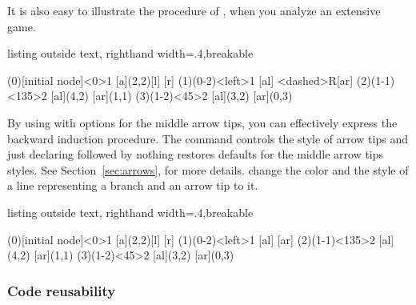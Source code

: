 It is also easy to illustrate the procedure of , when you analyze an extensive game.


\begin{tcblisting}{listing outside text, righthand width=.4\linewidth,breakable}
\begin{istgame}[>=stealth]
\xtdistance{15mm}{30mm}
\istroot[-135](0)[initial node]<0>{1}
  [a]{(2,2)}[l]
  [r]
\endist 
\istroot(1)(0-2)<left>{1}
  [al]
  \istb<dashed>{R}[ar]
\endist 
\xtdistance{10mm}{20mm}
\istroot(2)(1-1)<135>{2}
  [al]{(4,2)}
  [ar]{(1,1)}
\endist 
\istroot(3)(1-2)<45>{2}
  [al]{(3,2)}
  [ar]{(0,3)}
\endist 
\end{istgame}
\end{tcblisting}

By using \cmd{\istb} with options for the middle arrow tips, you can effectively express the backward induction procedure.
The command \cmd{\setxtarrowtips} controls the style of arrow tips and just declaring \cmd{\setxtarrowtips} followed by nothing restores defaults for the middle arrow tips styles. See Section~\ref{sec:arrows}, for more details.
change the color and the style of a line representing a branch and an arrow tip to it.

\begin{tcblisting}{listing outside text, righthand width=.4\linewidth,breakable}
\begin{istgame}
\setxtarrowtips[red,very thick,shorten >=-2pt,shorten <=-2pt]
\xtdistance{15mm}{30mm}
\istroot[-135](0)[initial node]<0>{1}
  [a]{(2,2)}[l]
  [r]
  \endist 
\istroot(1)(0-2)<left>{1}
  [al]
  [ar]
  \endist 
\xtdistance{10mm}{20mm}
\istroot(2)(1-1)<135>{2}
  \istb[->>>-,very thick,draw=blue]{\ell}[al]{(4,2)}
  [ar]{(1,1)}
  \endist 
\setxtarrowtips %
\istroot(3)(1-2)<45>{2}
  [al]{(3,2)}
  [ar]{(0,3)}
  \endist 
\end{istgame}
\end{tcblisting}


\subsubsection{Code reusability}

